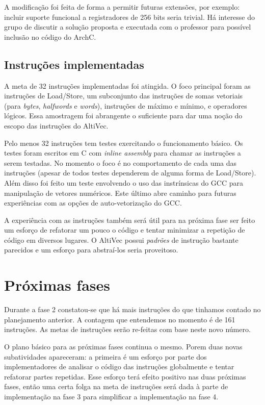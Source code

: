 \documentclass[twocolumn]{article}
\newcommand{\tech}[1]{\textit{#1}}
\begin{document}
A modificação foi feita de forma a permitir futuras extensões, por exemplo:
incluir suporte funcional a registradores de 256 bits seria trivial. Há interesse
do grupo de discutir a solução proposta e executada com o professor para possível
inclusão no código do ArchC.

\subsection{Instruções implementadas}

A meta de 32 instruções implementadas foi atingida. O foco principal foram as
instruções de Load/Store, um subconjunto das instruções de somas vetoriais
(para \tech{bytes}, \tech{halfwords} e \tech{words}), instruções de máximo e
mínimo, e operadores lógicos. Essa amostragem foi abrangente o suficiente para
dar uma noção do escopo das instruções do AltiVec.

Pelo menos 32 instruções tem testes exercitando o funcionamento básico. Os
testes foram escritos em C com \tech{inline assembly} para chamar as instruções
a serem testadas. No momento o foco é no comportamento de cada uma das
instruções (apesar de todos testes dependerem de alguma forma de Load/Store).
Além disso foi feito um teste envolvendo o uso das instrínsicas do GCC para
manipulação de vetores numéricos. Este último abre caminho para futuras
experiências com as opções de auto-vetorização do GCC.

A experiência com as instruções também será útil para na próxima fase ser feito
um esforço de refatorar um pouco o código e tentar minimizar a repetição de
código em diversos lugares. O AltiVec possui \tech{padrões} de instrução
bastante parecidos e um esforço para abstraí-los seria proveitoso.


\section{Próximas fases}

Durante a fase 2 constatou-se que há mais instruções do que tinhamos contado no
planejamento anterior. A contagem que entendemos no momento é de 161
instruções. As metas de instruções serão re-feitas com base neste novo número.

O plano básico para as próximas fases continua o mesmo. Porem duas novas
subatividades apareceram: a primeira é um esforço por parte dos implementadores
de analisar o código das instruções globalmente e tentar refatorar partes
repetidas. Esse esforço terá efeito positivo nas duas próximas fases, então uma
certa folga na meta de instruções será dada à parte de implementação na fase 3
para simplificar a implementação na fase 4.
\end{document}
